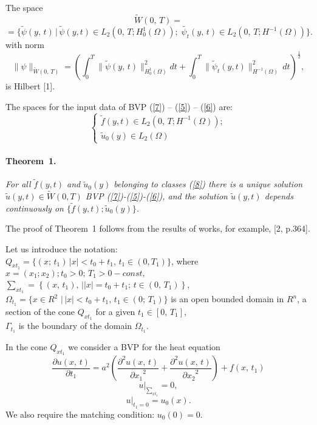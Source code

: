 The space
$$
\tilde {W}(0,\,T)=$$
$$=\{\tilde{\psi}(y,\,t)\,\Big | \,\tilde \psi(y,t)\in L_{2}(0,\,T;H_{0}^{1}(\Omega)); \;
\tilde{\psi_{t}}(y,\,t)\in L_{2}(0,\,T;H^{-1}(\Omega))\}.
$$
with norm
$$
\|\psi\|_{\tilde{W}(0,\,T)}=
\left(\int_{0}^{T}\|\tilde{\psi}(y,\,t)
\|_{H_{0}^{1}(\Omega)}^{2}dt
+\int_{0}^{T}\|\tilde{\psi}_{t}(y,t)\|_{H^{-1}(\Omega)}^{2}\,
dt\right)^{\frac{1}{2}},
$$
is Hilbert [1].

The spaces for the input data of BVP (\ref{7}) -- (\ref{5}) -- (\ref{6}) are:
\begin{equation}\label{8}
\begin{cases}
\tilde{f}(y,t)\in L_{2}(0,\,T;H^{-1}(\Omega));\\
\tilde{u}_{0}(y)\in L_{2}(\Omega)
\end{cases}
\end{equation}
\paragraph{Theorem~1.}
{\it For all $\tilde{f}(y,t)$ and $\tilde{u}_{0}(y)$ belonging to classes (\ref{8}) there is a unique solution $\tilde{u}(y, t)\in\tilde{W}(0, T)$ BVP (\ref{7})-(\ref{5})-(\ref{6}), and the solution $\tilde {u} (y, t)$ depends continuously on $\{\tilde{f}(y,t); \tilde{u}_{0}(y)\}$.}

The proof of Theorem~1 follows from the results of works, for example, [2, p.364].

Let us introduce the notation:\\
$
Q_{xt_{1}}=\{(x;\,t_{1})\,|x|<t_{0}+t_{1},\, t_{1}\in(0, T_{1})\}$,
where $x=(x_{1}; x_{2}); t_{0}>0;\,T_{1}>0-const,$\\
 $\sum_{xt_1}=\left\{(x,\,t_{1}),\,| |x|=t_{0}+t_{1};\, t\in(0,\,T_{1})\right\}$,\\
$\Omega_{t_{1}}=\{x\in R^{2}\,\, | \,|x|<t_{0}+t_{1}, \,t_{1}\in(0;\,T_{1})\}$ is an open bounded domain in $R^{n}$, a section of the cone $Q_{xt_{1}}$ for a given $t_1 \in [0, \, T_1]$, \\
$\Gamma_{t_1}$ is the boundary of the domain $\Omega_{t_{1}}$.

In the cone $Q_{xt_{1}}$ we consider a BVP for the heat equation
\begin{equation}\label{1}
\frac{\partial u(x,\,t)}{\partial t_{1}}=a^2\left(\frac{{\partial}^2u(x,\,t)}{{\partial x_{1}}^2}+\frac{{\partial}^2u(x,\,t)}{{\partial x_{2}}^2}\right)+f(x,\, t_{1})
\end{equation}
\begin{equation}\label{2}
u|_{\sum_{xt_1}}=0,
\end{equation}
\begin{equation}\label{3}
u|_{t_{1}=0}=u_{0}(x).
\end{equation}
We also require the matching condition: $u_{0}(0)=0$.

